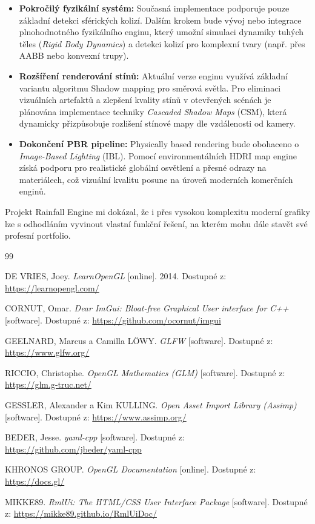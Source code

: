 \documentclass[12pt,a4paper]{article}
\begin{document}
\begin{itemize}
    \item \textbf{Pokročilý fyzikální systém:} Současná implementace podporuje pouze základní detekci sférických kolizí. Dalším krokem bude vývoj nebo integrace plnohodnotného fyzikálního enginu, který umožní simulaci dynamiky tuhých těles (\textit{Rigid Body Dynamics}) a detekci kolizí pro komplexní tvary (např. přes AABB nebo konvexní trupy).
    
    \item \textbf{Rozšíření renderování stínů:} Aktuální verze enginu využívá základní variantu algoritmu Shadow mapping pro směrová světla. Pro eliminaci vizuálních artefaktů a zlepšení kvality stínů v otevřených scénách je plánována implementace techniky \textit{Cascaded Shadow Maps} (CSM), která dynamicky přizpůsobuje rozlišení stínové mapy dle vzdálenosti od kamery.
    
    \item \textbf{Dokončení PBR pipeline:} Physically based rendering bude obohaceno o \textit{Image-Based Lighting} (IBL). Pomocí environmentálních HDRI map engine získá podporu pro realistické globální osvětlení a přesné odrazy na materiálech, což vizuální kvalitu posune na úroveň moderních komerčních enginů.
\end{itemize}

Projekt Rainfall Engine mi dokázal, že i přes vysokou komplexitu moderní grafiky lze s odhodláním vyvinout vlastní funkční řešení, na kterém mohu dále stavět své profesní portfolio.


\newpage
\begin{thebibliography}{99}

    DE VRIES, Joey. \textit{LearnOpenGL} [online]. 2014. Dostupné z: \url{https://learnopengl.com/}

    CORNUT, Omar. \textit{Dear ImGui: Bloat-free Graphical User interface for C++} [software]. Dostupné z: \url{https://github.com/ocornut/imgui}

    GEELNARD, Marcus a Camilla LÖWY. \textit{GLFW} [software]. Dostupné z: \url{https://www.glfw.org/}

    RICCIO, Christophe. \textit{OpenGL Mathematics (GLM)} [software]. Dostupné z: \url{https://glm.g-truc.net/}

    GESSLER, Alexander a Kim KULLING. \textit{Open Asset Import Library (Assimp)} [software]. Dostupné z: \url{https://www.assimp.org/}

    BEDER, Jesse. \textit{yaml-cpp} [software]. Dostupné z: \url{https://github.com/jbeder/yaml-cpp}

    KHRONOS GROUP. \textit{OpenGL Documentation} [online]. Dostupné z: \url{https://docs.gl/}

    MIKKE89. \textit{RmlUi: The HTML/CSS User Interface Package} [software]. Dostupné z: \url{https://mikke89.github.io/RmlUiDoc/}

\end{thebibliography}
\end{document}
